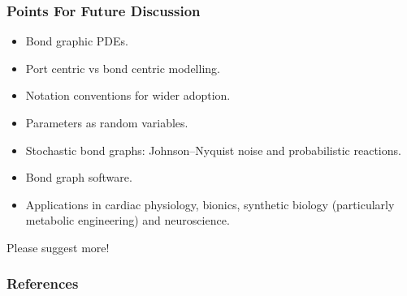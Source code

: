 \documentclass[10pt,reqno]{beamer}
\begin{document}
\begin{frame}
\frametitle{Points For Future Discussion}
\begin{itemize}
	\item Bond graphic PDEs.
	\item Port centric vs bond centric modelling.
	\item Notation conventions for wider adoption.
	\item Parameters as random variables.
	\item Stochastic bond graphs: Johnson–Nyquist noise and probabilistic reactions.
	\item Bond graph software.
	\item Applications in cardiac physiology, bionics, synthetic biology (particularly metabolic engineering) and neuroscience.
\end{itemize}
Please suggest more!
\end{frame}
\begin{frame}
\frametitle{References}
\printbibliography
\end{frame}
\end{document}
